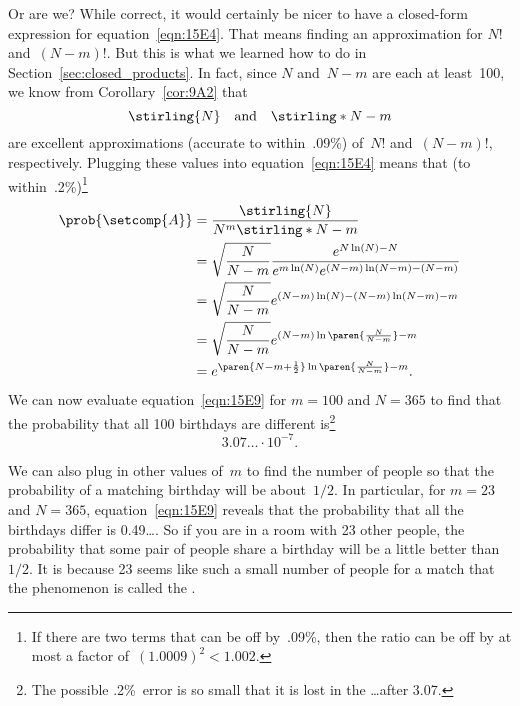 Or are we?  While correct, it would certainly be nicer to have a
closed-form expression for equation~\eqref{eqn:15E4}.  That means
finding an approximation for $N!$ and~$(N - m)!$.  But this is what we
learned how to do in Section~\ref{sec:closed_products}.  In fact, since
$N$ and~$N - m$ are each at least~100, we know from
Corollary~\ref{cor:9A2} that
\begin{equation*}
    \stirling{N} \quad \text{and} \quad \stirling*{N - m}
\end{equation*}
are excellent approximations (accurate to within~.09\%) of~$N!$ and~$(N
- m)!$, respectively.  Plugging these values into
equation~\eqref{eqn:15E4} means that (to within~.2\%)\footnote{If there
are two terms that can be off by~.09\%, then the ratio can be off by
at most a factor of~$(1.0009)^2 < 1.002$.}
\begingroup
{}\jot
\begin{align}
\prob{\setcomp{A}}
    &= \frac{ \stirling{N} }{ N^m \stirling*{N - m} } \notag\\
    &= \sqrt{\frac{N}{N - m}}
             \frac{ e^{N \ln(N) - N} }
                  { e^{m \ln(N)} e^{(N - m) \ln(N - m) - (N - m) } }
                  \notag\\
    &= \sqrt{\frac{N}{N - m}}
         e^{ (N - m)\ln(N) - (N - m) \ln(N - m) - m } \notag\\
    &= \sqrt{\frac{N}{N - m}}
         e^{ (N - m)\ln\paren{\frac{N}{N - m}} - m } \notag\\
    &= e^{ \paren{N - m + \frac{1}{2}}\ln\paren{\frac{N}{N - m}} - m }.
        \label{eqn:15E9}
\end{align}
\endgroup
We can now evaluate equation~\eqref{eqn:15E9} for $m = 100$ and $N =
365$ to find that the probability that all 100 birthdays are different
is\footnote{The possible .2\%~error is so small that
  it is lost in the \dots after 3.07.}
\begin{equation*}
    3.07\ldots \cdot 10^{-7}.
\end{equation*}

We can also plug in other values of~$m$ to find the number of people
so that the probability of a matching birthday will be about~$1/2$.
In particular, for $m = 23$ and $N = 365$, equation~\eqref{eqn:15E9}
reveals that the probability that all the birthdays differ is
0.49\dots.  So if you are in a room with 23 other people, the
probability that some pair of people share a birthday will be a little
better than~$1/2$.  It is because 23 seems like such a small number of
people for a match that the phenomenon is called the .

